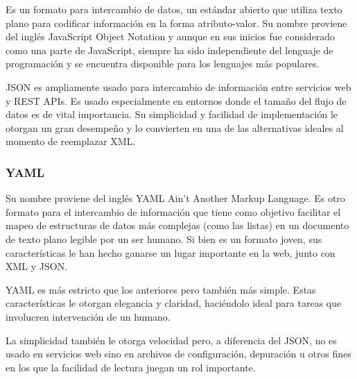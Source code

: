 Es un formato para intercambio de datos, un estándar abierto que utiliza texto plano para codificar información en la forma atributo-valor. Su nombre proviene del inglés JavaScript Object Notation y aunque en sus inicios fue considerado como una parte de JavaScript, siempre ha sido independiente del lenguaje de programación y se encuentra disponible para los lenguajes más populares.

JSON es ampliamente usado para intercambio de información entre servicios web y REST APIs. Es usado especialmente en entornos donde el tamaño del flujo de datos es de vital importancia. Su simplicidad y facilidad de implementación le otorgan un gran desempeño y lo convierten en una de las alternativas ideales al momento de reemplazar XML.

\subsubsection{YAML}

Su nombre proviene del inglés YAML Ain’t Another Markup Language. Es otro formato para el intercambio de información que tiene como objetivo facilitar el mapeo de estructuras de datos más complejas (como las listas) en un documento de texto plano legible por un ser humano. Si bien es un formato joven, sus características le han hecho ganarse un lugar importante en la web, junto con XML y JSON.

YAML es más estricto que los anteriores pero también más simple. Estas características le otorgan elegancia y claridad, haciéndolo ideal para tareas que involucren intervención de un humano.

La simplicidad también le otorga velocidad pero, a diferencia del JSON, no es usado en servicios web sino en archivos de configuración, depuración u otros fines en los que la facilidad de lectura juegan un rol importante.
